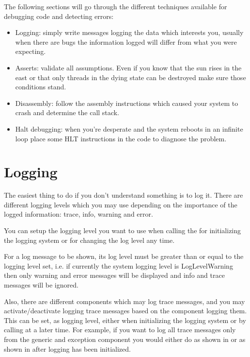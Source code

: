 \begin{appendices}
The following sections will go through the different techniques available for debugging code and
detecting errors:
\begin{itemize}
	\item Logging: simply write messages logging the data which interests you, usually when there
are bugs the information logged will differ from what you were expecting.

	\item Asserts: validate all assumptions. Even if you know that the sun rises in the east or that
only threads in the dying state can be destroyed make sure those conditions stand.

	\item Disassembly: follow the assembly instructions which caused your system to crash and 
determine the call stack.

	\item Halt debugging: when you're desperate and the system reboots in an infinite loop place
some HLT instructions in the code to diagnose the problem.
\end{itemize}

\section{Logging}

The easiest thing to do if you don't understand something is to log it. There are different logging
levels which you may use depending on the importance of the logged information: trace, info, warning
and error.

You can setup the logging level you want to use when calling the  for
initializing the logging system or  for changing the log level any time.

For a log message to be shown, its log level must be greater than or equal to the logging level set,
 i.e. if currently the system logging level is LogLevelWarning then only warning and error messages
will be displayed and info and trace messages will be ignored.

Also, there are different components which may log trace messages, and you may activate/deactivate
logging trace messages based on the component logging them. This can be set, as logging level, 
either when initializing the logging system or by calling  at a later
time. For example, if you want to log all trace messages only from the generic and exception
component you would either do as shown in  or as shown in
 after logging has been initialized.


\end{appendices}
